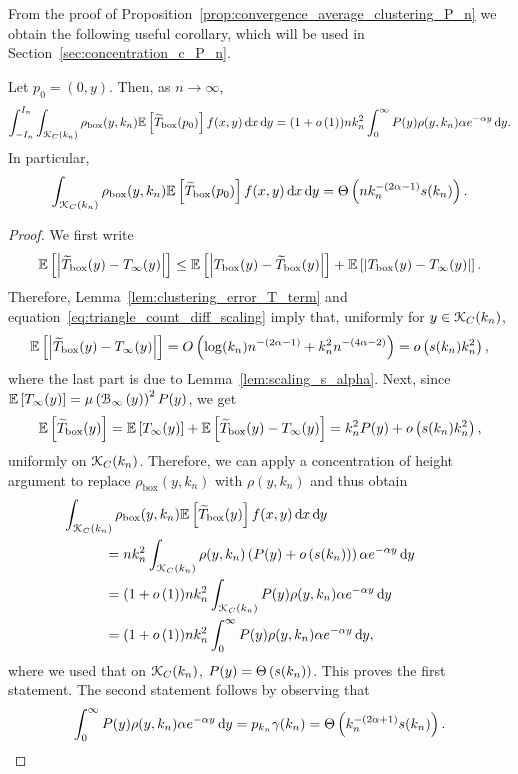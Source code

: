 From the proof of Proposition~\ref{prop:convergence_average_clustering_P_n} we obtain the following useful corollary, which will be used in Section~\ref{sec:concentration_c_P_n}. 

\begin{corollary}\label{cor:adjusted_triangle_counting_P_n}
Let $p_0 = (0,y)$. Then, as $n \to \infty$,
\[
	\int_{-I_n}^{I_n}\int_{{\mathcal K}_{C}(k_n)} \rho_{\text{box}}(y,k_n) \mathbb{E}\left[\widetilde{T}_{\text{box}}(p_0)\right] f(x,y) \operatorname{\mathrm{d}\hspace{-2pt}} x \operatorname{\mathrm{d}\hspace{-2pt}} y
	= (1+o\left(1\right)) n k_n^2 \int_0^\infty P(y) \rho(y,k_n) \alpha e^{-\alpha y} \operatorname{\mathrm{d}\hspace{-2pt}} y. 
\]
In particular,
\[
	\int_{{\mathcal K}_{C}(k_n)} \rho_{\text{box}}(y,k_n) \mathbb{E}\left[\widetilde{T}_{\text{box}}(p_0)\right] f(x,y) \operatorname{\mathrm{d}\hspace{-2pt}} x \operatorname{\mathrm{d}\hspace{-2pt}} y
	= \Theta\left(n k_n^{-(2\alpha - 1)} s(k_n)\right).
\]
\end{corollary}

\begin{proof}
We first write
\[
	\mathbb{E}\left[\left|\widetilde{T}_{\text{box}}(y) - T_{\infty}(y)\right|\right] 
	\le \mathbb{E}\left[\left|T_{\text{box}}(y) - \widetilde{T}_{\text{box}}(y) \right|\right]
	+\mathbb{E}\left[\left|T_{\text{box}}(y) - T_{\infty}(y)\right|\right].
\]
Therefore, Lemma~\ref{lem:clustering_error_T_term} and equation~\eqref{eq:triangle_count_diff_scaling} imply that, uniformly for $y \in {\mathcal K}_C(k_n)$,
\[
	\mathbb{E}\left[\left|\widetilde{T}_{\text{box}}(y) - T_{\infty}(y)\right|\right] = O\left(\log(k_n)n^{-(2\alpha - 1)}
	+ k_n^2 n^{-(4\alpha - 2)}\right)	= o\left(s(k_n) k_n^2\right),
\]
where the last part is due to Lemma~\ref{lem:scaling_s_alpha}.
Next, since $\mathbb{E}\left[T_\infty(y)\right] = \mu\left({\mathcal B}_{\infty}\left(y\right)\right)^2 P(y)$, we get
\[
	\mathbb{E}\left[\widetilde{T}_{\text{box}}(y)\right] = \mathbb{E}\left[T_{\infty}(y)\right] + \mathbb{E}\left[\widetilde{T}_{\text{box}}(y) - T_{\infty}(y)\right] 
	= k_n^2 P(y) + o\left(s(k_n)k_n^2\right),
\]
uniformly on ${\mathcal K}_{C}(k_n)$. Therefore, we can apply a concentration of height argument to replace $\rho_{\text{box}}(y,k_n)$ with $\rho(y,k_n)$ and thus obtain
\begin{align*}
	&\hspace{-30pt}\int_{\Kcal_{C}(k_n)} \rho_{\text{box}}(y,k_n) \Exp{\widetilde{T}_{\text{box}}(y)} 
		f(x,y) \dd x \dd y\\
	&= n k_n^2 \int_{\Kcal_{C}(k_n)} \rho(y,k_n) \left(P(y) + \smallO{s(k_n)}\right)
		\alpha e^{-\alpha y} \dd y\\
	&= (1+\smallO{1}) n k_n^2 \int_{\Kcal_{C}(k_n)} P(y) \rho(y,k_n) \alpha e^{-\alpha y} \dd y\\
	&= (1+\smallO{1}) n k_n^2 \int_0^\infty P(y) \rho(y,k_n) \alpha e^{-\alpha y} \dd y,
\end{align*}
where we used that on ${\mathcal K}_{C}(k_n)$, $P(y) = \Theta\left(s(k_n)\right)$. This proves the first statement. The second statement follows by observing that
\[
	\int_0^\infty P(y) \rho(y,k_n) \alpha e^{-\alpha y} \operatorname{\mathrm{d}\hspace{-2pt}} y = p_{k_n} \gamma(k_n)
	= \Theta\left(k_n^{-(2\alpha + 1)} s(k_n)\right).
\]
\end{proof}

